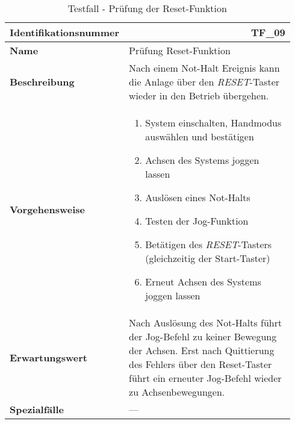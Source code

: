 \documentclass[../../../Bachelorarbeit.tex]{subfiles}
\begin{document}
\begin{table}[H]
    \centering
    \begin{tabular}{ p{0.34\linewidth}  p{0.6\linewidth} }
        \hline
        \textbf{Identifikationsnummer}  & \multicolumn{1}{r}{TF\_09} \\ \hline
        \textbf{Name}                   & Prüfung Reset-Funktion \\
        \textbf{Beschreibung}           & Nach einem Not-Halt Ereignis kann die Anlage über den \textit{RESET}-Taster wieder in den Betrieb übergehen. \\
        \textbf{Vorgehensweise}         &   {\begin{enumerate}[noitemsep,topsep=0pt,parsep=0pt,partopsep=0pt,leftmargin=*]
                                                \item System einschalten, Handmodus auswählen und bestätigen
                                                \item Achsen des Systems joggen lassen
                                                \item Auslösen eines Not-Halts
                                                \item Testen der Jog-Funktion
                                                \item Betätigen des \textit{RESET}-Tasters (gleichzeitig der Start-Taster)
                                                \item Erneut Achsen des Systems joggen lassen
                                            \end{enumerate}} \\
        \textbf{Erwartungswert}         & Nach Auslösung des Not-Halts führt der Jog-Befehl zu keiner Bewegung der Achsen. Erst nach Quittierung des Fehlers über den Reset-Taster führt ein erneuter Jog-Befehl wieder zu Achsenbewegungen. \\
        \textbf{Spezialfälle}           & --- \\ \hline
    \end{tabular}
    \caption[\acs{tf} - Reset-Funktion]{Testfall - Prüfung der Reset-Funktion}
    \label{tab:my-table68}
\end{table}
\end{document}
